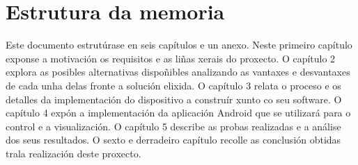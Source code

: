 \section{Estrutura da memoria}
Este documento estrutúrase en seis capítulos e un anexo. Neste primeiro capítulo exponse a motivación os requisitos e as liñas xerais do proxecto. O capítulo 2 explora as posibles alternativas dispoñibles analizando as vantaxes e desvantaxes de cada unha delas fronte a solución elixida. O capítulo 3 relata o proceso e os detalles da implementación do dispositivo a construír xunto co seu software. O capítulo 4 expón a implementación da aplicación Android que se utilizará para o control e a visualización. O capítulo 5 describe as probas realizadas e a análise dos seus resultados. O sexto e derradeiro capítulo recolle as conclusión obtidas trala realización deste proxecto.
